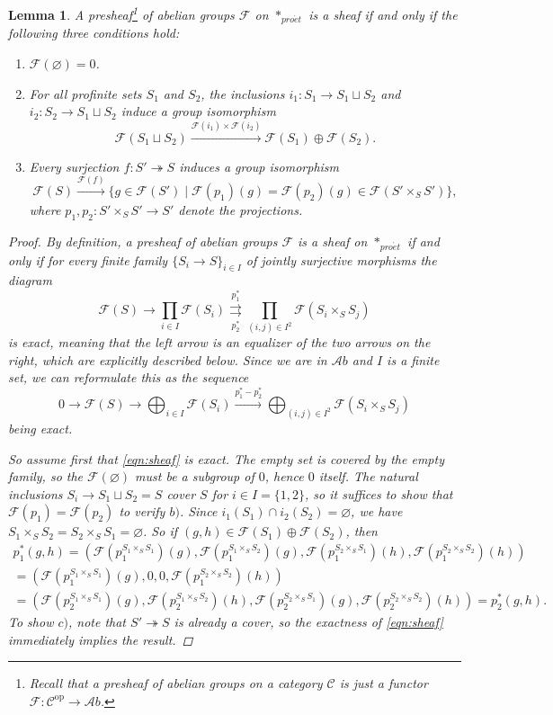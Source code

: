 \documentclass[11pt,A4]{article}
\theoremstyle{plain}
\newtheorem{lm}[thm]{Lemma}
\theoremstyle{definition}
\theoremstyle{remark}
\newcommand{\1}{\mathbbm{1}}
\newcommand{\F}{\mathcal{F}}
\newcommand{\scrC}{\mathscr{C}}
\newcommand{\Ab}{\mathscr{A}b}
\newcommand{\pe}{*_{pro\acute et}}
\newcommand{\op}{\oplus}
\begin{document}
\begin{lm}\label{lm:sheaf}
    A presheaf\footnote{Recall that a presheaf of abelian groups on a category $\scrC$ is just a functor $\F\colon \scrC^{\mathrm{op}}\to \Ab$.} of abelian groups $\F$ on $\pe$ is a sheaf if and only if the following three conditions hold:
    \begin{enumerate}[label=\alph*)]
	\item $\F(\varnothing)=0$.
	\item For all profinite sets $S_{1}$ and $S_{2}$, the inclusions $i_{1}\colon S_{1}\to S_{1}\sqcup S_{2}$ and $i_{2}\colon S_{2}\to S_{1}\sqcup S_{2}$ induce a group isomorphism
	    \[ \F(S_{1}\sqcup S_{2})\xrightarrow{\F(i_{1})\times \F(i_{2})} \F(S_{1})\op \F(S_{2}).\]
	\item Every surjection $f\colon S'\twoheadrightarrow S$ induces a group isomorphism
	    \[ \F(S)\xrightarrow{\F(f)} \{ g\in \F(S') \mid \F(p_{1})(g)=\F(p_{2})(g) \in \F(S'\times_{S}S') \}, \]
	    where $p_{1},p_{2}\colon S'\times_{S}S'\to S'$ denote the projections.
    \end{enumerate}
    \begin{proof}
	By definition, a presheaf of abelian groups $\F$ is a sheaf on $\pe$ if and only if for every finite family $\{ S_{i}\to S\}_{i\in I}$ of jointly surjective morphisms the diagram
	\[ \F(S)\to \prod_{i\in I} \F(S_{i})\overset{p_{1}^{*}}{\underset{p_{2}^{*}}{\rightrightarrows}}\prod_{(i,j)\in I^{2}} \F(S_{i}\times_{S} S_{j}) \]
	is exact, meaning that the left arrow is an equalizer of the two arrows on the right, which are explicitly described below.
	Since we are in $\Ab$ and $I$ is a finite set, we can reformulate this as the sequence
	\begin{equation}\label{eqn:sheaf}
	    0\to \F(S)\to \bigoplus_{i\in I} \F(S_{i})\xrightarrow{p_{1}^{*}-p_{2}^{*}} \bigoplus_{(i,j)\in I^{2}} \F(S_{i}\times_{S}S_{j})
	\end{equation}
	being exact.

	So assume first that \ref{eqn:sheaf} is exact.
	The empty set is covered by the empty family, so the $\F(\varnothing)$ must be a subgroup of $0$, hence $0$ itself.
	The natural inclusions $S_{i}\to S_{1}\sqcup S_{2}=S$ cover $S$ for $i\in I=\{1,2\}$, so it suffices to show that $\F(p_{1})=\F(p_{2})$ to verify $b)$.
	Since $i_{1}(S_{1})\cap i_{2}(S_{2})=\varnothing $, we have $S_{1}\times_{S}S_{2}=S_{2}\times_{S}S_{1}=\varnothing $.
	So if $(g,h)\in \F(S_{1})\op \F(S_{2})$, then
	\begin{multline*}
	    p_{1}^{*}(g,h)=(\F(p_{1}^{S_{1}\times_{S}S_{1}})(g),\F(p_{1}^{S_{1}\times_{S}S_{2}})(g),\F(p_{1}^{S_{2}\times_{S}S_{1}})(h),\F(p_{1}^{S_{2}\times_{S}S_{2}})(h)) \\ 
	    =(\F(p_{1}^{S_{1}\times_{S}S_{1}})(g),0,0,\F(p_{1}^{S_{2}\times_{S}S_{2}})(h)) \\
	    =(\F(p_{2}^{S_{1}\times_{S}S_{1}})(g),\F(p_{2}^{S_{1}\times_{S}S_{2}})(h),\F(p_{2}^{S_{2}\times_{S}S_{1}})(g),\F(p_{2}^{S_{2}\times_{S}S_{2}})(h))=p_{2}^{*}(g,h).
	\end{multline*}
	To show $c)$, note that $S'\twoheadrightarrow S$ is already a cover, so the exactness of \ref{eqn:sheaf} immediately implies the result.


\end{proof}
\end{lm}
\end{document}
